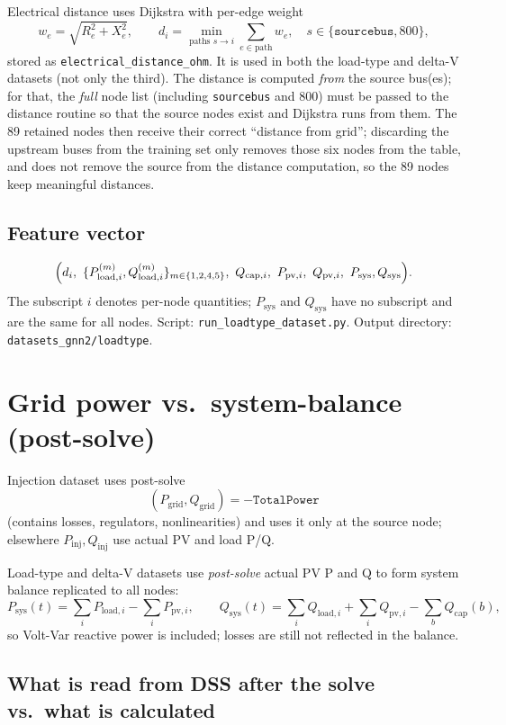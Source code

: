\documentclass[11pt]{article}
\begin{document}
Electrical distance uses Dijkstra with per-edge weight
\[
w_e=\sqrt{R_e^2+X_e^2},\qquad
d_i=\min_{\text{paths }s\to i}\sum_{e\in\text{path}}w_e,\quad s\in\{\texttt{sourcebus},800\},
\]
stored as \texttt{electrical\_distance\_ohm}. It is used in both the load-type and delta-V datasets (not only the third). The distance is computed \emph{from} the source bus(es); for that, the \emph{full} node list (including \texttt{sourcebus} and 800) must be passed to the distance routine so that the source nodes exist and Dijkstra runs from them. The 89 retained nodes then receive their correct ``distance from grid''; discarding the upstream buses from the training set only removes those six nodes from the table, and does not remove the source from the distance computation, so the 89 nodes keep meaningful distances.

\subsection*{Feature vector}

\[
\Bigl(
d_i,\ \{P^{(m)}_{\mathrm{load},i},Q^{(m)}_{\mathrm{load},i}\}_{m\in\{1,2,4,5\}},\
Q_{\mathrm{cap},i},\ P_{\mathrm{pv},i},\ Q_{\mathrm{pv},i},\ P_{\mathrm{sys}},Q_{\mathrm{sys}}
\Bigr).
\]
The subscript $i$ denotes per-node quantities; $P_{\mathrm{sys}}$ and $Q_{\mathrm{sys}}$ have no subscript and are the same for all nodes. Script: \texttt{run\_loadtype\_dataset.py}. Output directory: \texttt{datasets\_gnn2/loadtype}.

\section{Grid power vs.\ system-balance (post-solve)}

Injection dataset uses post-solve
\[
(P_{\mathrm{grid}},Q_{\mathrm{grid}})=-\mathtt{TotalPower}
\]
(contains losses, regulators, nonlinearities) and uses it only at the source node; elsewhere $P_{\mathrm{inj}},Q_{\mathrm{inj}}$ use actual PV and load P/Q.

Load-type and delta-V datasets use \emph{post-solve} actual PV P and Q to form system balance replicated to all nodes:
\[
P_{\mathrm{sys}}(t)=\sum_i P_{\mathrm{load},i}-\sum_i P_{\mathrm{pv},i},\qquad
Q_{\mathrm{sys}}(t)=\sum_i Q_{\mathrm{load},i}+\sum_i Q_{\mathrm{pv},i}-\sum_b Q_{\mathrm{cap}}(b),
\]
so Volt-Var reactive power is included; losses are still not reflected in the balance.

\subsection*{What is read from DSS after the solve vs.\ what is calculated}
\end{document}
